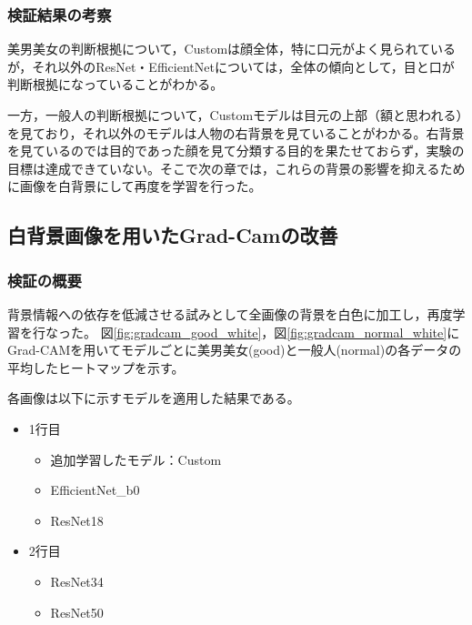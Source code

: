 \documentclass[a4paper,11pt,titlepage]{jsarticle}
\begin{document}
\subsubsection{検証結果の考察}
美男美女の判断根拠について，Customは顔全体，特に口元がよく見られているが，それ以外のResNet・EfficientNetについては，全体の傾向として，目と口が判断根拠になっていることがわかる。\par
一方，一般人の判断根拠について，Customモデルは目元の上部（額と思われる）を見ており，それ以外のモデルは人物の右背景を見ていることがわかる。右背景を見ているのでは目的であった顔を見て分類する目的を果たせておらず，実験の目標は達成できていない。そこで次の章では，これらの背景の影響を抑えるために画像を白背景にして再度を学習を行った。



\clearpage

\subsection{白背景画像を用いたGrad-Camの改善}
\subsubsection{検証の概要}

背景情報への依存を低減させる試みとして全画像の背景を白色に加工し，再度学習を行なった。
図\ref{fig:gradcam_good_white}，図\ref{fig:gradcam_normal_white}にGrad-CAMを用いてモデルごとに美男美女(good)と一般人(normal)の各データの平均したヒートマップを示す。

各画像は以下に示すモデルを適用した結果である。
\begin{itemize}
	\item 1行目
	\begin{itemize}
	\item 追加学習したモデル：Custom
	\item EfficientNet\_b0
	\item ResNet18
	\end{itemize}
	\item 2行目
	\begin{itemize}
	\item ResNet34
	\item ResNet50
	\end{itemize}
\end{itemize}
\end{document}
